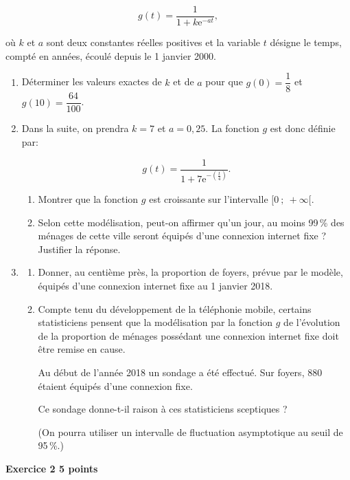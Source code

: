 \documentclass[10pt,a4paper]{article}
\begin{document}
\[g(t) = \dfrac{1}{1 + k\text{e}^{- at}},\]

où $k$ et $a$ sont deux constantes réelles positives et la variable $t$ désigne le temps, compté en années, écoulé depuis le 1 janvier 2000.

\medskip

\begin{enumerate}
\item Déterminer les valeurs exactes de $k$ et de $a$ pour que $g(0) = \dfrac{1}{8}$ et $g(10) = \dfrac{64}{100}$.
\item Dans la suite, on prendra $k = 7$ et $a = 0,25$. La fonction $g$ est donc définie par:

\[g(t) = \dfrac{1}{1 + 7\text{e}^{- \left(\frac{t}{4}\right)}}.\]

	\begin{enumerate}
		\item Montrer que la fonction $g$ est croissante sur l'intervalle $[0~;~+ \infty[$.
		\item Selon cette modélisation, peut-on affirmer qu'un jour, au moins 99\,\% des ménages de cette ville seront équipés d'une connexion internet fixe ? Justifier la réponse.
	\end{enumerate}
\item 
	\begin{enumerate}
		\item Donner, au centième près, la proportion de foyers, prévue par le modèle, équipés d'une connexion internet fixe au 1 janvier 2018.
		\item Compte tenu du développement de la téléphonie mobile, certains statisticiens pensent que la modélisation par la fonction $g$ de l'évolution de la proportion de ménages possédant une connexion internet fixe doit être remise en cause.
		
Au début de l'année 2018 un sondage a été effectué. Sur  foyers, $880$ étaient équipés d'une connexion fixe. 

Ce sondage donne-t-il raison à ces statisticiens sceptiques ?

(On pourra utiliser un intervalle de fluctuation asymptotique au seuil de 95\,\%.)
	\end{enumerate}
\end{enumerate}

\vspace{0,5cm}

\textbf{Exercice 2 \hfill 5 points}
\end{document}
